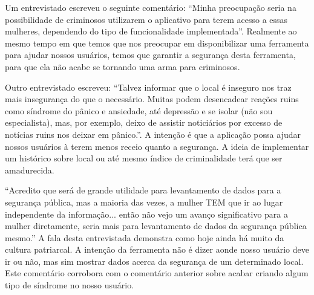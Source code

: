 Um entrevistado escreveu o seguinte comentário: “Minha preocupação seria na possibilidade de criminosos utilizarem o aplicativo para terem acesso a essas mulheres, dependendo do tipo de funcionalidade implementada”. Realmente ao mesmo tempo em que temos que nos preocupar em disponibilizar uma ferramenta para ajudar nossos usuários, temos que garantir a segurança desta ferramenta, para que ela não acabe se tornando uma arma para criminosos.

Outro entrevistado escreveu: “Talvez informar que o local é inseguro nos traz mais insegurança do que o necessário. Muitas podem desencadear reações ruins como síndrome do pânico e ansiedade, até depressão e se isolar (não sou especialista), mas, por exemplo, deixo de assistir noticiários por excesso de notícias ruins nos deixar em pânico.”. A intenção é que a aplicação possa ajudar nossos usuários à terem menos receio quanto a segurança. A ideia de implementar um histórico sobre local ou até mesmo índice de criminalidade terá que ser amadurecida.

“Acredito que será de grande utilidade para levantamento de dados para a segurança pública, mas a maioria das vezes, a mulher TEM que ir ao lugar independente da informação... então não vejo um avanço significativo para a mulher diretamente, seria mais para levantamento de dados da segurança pública mesmo.” A fala desta entrevistada demonstra como hoje ainda há muito da cultura patriarcal. A intenção da ferramenta não é dizer aonde nosso usuário deve ir ou não, mas sim mostrar dados acerca da segurança de um determinado local. Este comentário corrobora com o comentário anterior sobre acabar criando algum tipo de síndrome no nosso usuário.

